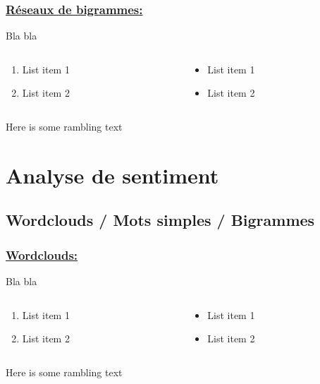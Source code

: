 \documentclass[xcolor=dvipsnames]{beamer}
\begin{document}
	\begin{frame}
		\frametitle{\underline{Réseaux de bigrammes:}}
		Bla bla 
		\begin{columns}
			\begin{column}{0.5\textwidth} %
				\begin{enumerate}
					\item List item 1
					\item List item 2
				\end{enumerate}
			\end{column}
			\begin{column}{0.5\textwidth}
				\begin{itemize}
					\item List item 1
					\item List item 2
				\end{itemize}
			\end{column}
		\end{columns}
		\vspace{\baselineskip}
		Here is some rambling text
	\end{frame}

	\section*{Analyse de sentiment}
	\subsection*{Wordclouds / Mots simples / Bigrammes}

	\begin{frame}
		\frametitle{\underline{Wordclouds:}}
		Bla bla 
		\begin{columns}
			\begin{column}{0.5\textwidth} %
				\begin{enumerate}
					\item List item 1
					\item List item 2
				\end{enumerate}
			\end{column}
			\begin{column}{0.5\textwidth}
				\begin{itemize}
					\item List item 1
					\item List item 2
				\end{itemize}
			\end{column}
		\end{columns}
		\vspace{\baselineskip}
		Here is some rambling text
	\end{frame}
\end{document}
